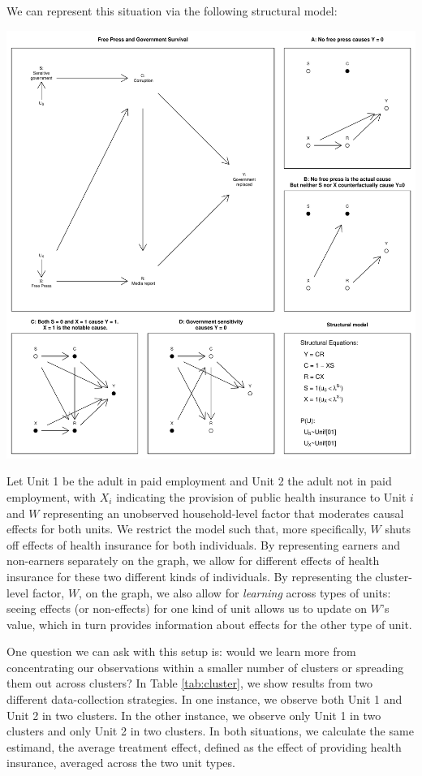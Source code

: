 \documentclass[
  12pt,
]{book}
\begin{document}
We can represent this situation via the following structural model:

\includegraphics{ii_files/figure-latex/unnamed-chunk-21-1.pdf}

Let Unit 1 be the adult in paid employment and Unit 2 the adult not in paid employment, with \(X_i\) indicating the provision of public health insurance to Unit \(i\) and \(W\) representing an unobserved household-level factor that moderates causal effects for both units. We restrict the model such that, more specifically, \(W\) shuts off effects of health insurance for both individuals. By representing earners and non-earners separately on the graph, we allow for different effects of health insurance for these two different kinds of individuals. By representing the cluster-level factor, \(W\), on the graph, we also allow for \emph{learning} across types of units: seeing effects (or non-effects) for one kind of unit allows us to update on \(W\)'s value, which in turn provides information about effects for the other type of unit.

One question we can ask with this setup is: would we learn more from concentrating our observations within a smaller number of clusters or spreading them out across clusters? In Table \ref{tab:cluster}, we show results from two different data-collection strategies. In one instance, we observe both Unit 1 and Unit 2 in two clusters. In the other instance, we observe only Unit 1 in two clusters and only Unit 2 in two clusters.
In both situations, we calculate the same estimand, the average treatment effect, defined as the effect of providing health insurance, averaged across the two unit types.
\end{document}

